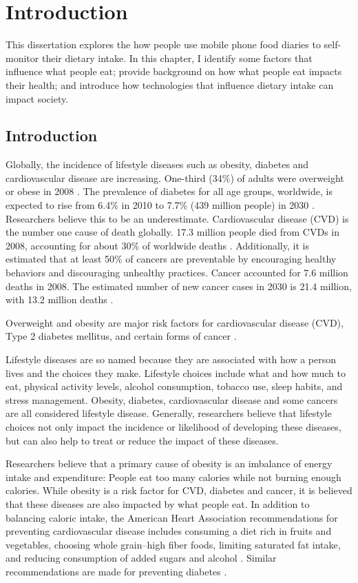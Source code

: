 \chapter {Introduction}

This dissertation explores the how people use mobile phone food diaries to self-monitor their dietary intake. In this chapter, I identify some factors that influence what people eat; provide background on how what people eat impacts their health; and introduce how technologies that influence dietary intake can impact society. 

\section{Introduction}
Globally, the incidence of lifestyle diseases such as obesity, diabetes and cardiovascular disease are increasing. One-third (34\%) of adults were overweight or obese in 2008 \citep{kimokoti_diet_2011}. The prevalence of diabetes for all age groups, worldwide, is expected to rise from 6.4\% in 2010 to 7.7\% (439 million people) in 2030 \citep{Shaw20104}. Researchers believe this to be an underestimate. Cardiovascular disease (CVD) is the number one cause of death globally. 17.3 million people died from CVDs in 2008, accounting for about 30\% of worldwide deaths \citep{WHO_CVD_2011}. Additionally, it is estimated that at least 50\% of cancers are preventable by encouraging healthy behaviors and discouraging unhealthy practices. Cancer accounted for 7.6 million deaths in 2008. The estimated number of new cancer cases in 2030 is 21.4 million, with 13.2 million deaths \citep{american_cancer_society_global_2011}. 

Overweight and obesity are major risk factors for cardiovascular disease (CVD), Type 2 diabetes mellitus, and certain forms of cancer \citep{guh_incidence_2009} \citep{calle_overweight_2004}. 

Lifestyle diseases are so named because they are associated with how a person lives and the choices they make. Lifestyle choices include what and how much to eat, physical activity levels, alcohol consumption, tobacco use, sleep habits, and stress management. Obesity, diabetes, cardiovascular disease and some cancers are all considered lifestyle disease. Generally, researchers believe that lifestyle choices not only impact the incidence or likelihood of developing these diseases, but can also help to treat or reduce the impact of these diseases. 

Researchers believe that a primary cause of obesity is an imbalance of energy intake and expenditure: People eat too many calories while not burning enough calories. While obesity is a risk factor for CVD, diabetes and cancer, it is believed that these diseases are also impacted by what people eat. In addition to balancing caloric intake, the American Heart Association recommendations for preventing cardiovascular disease includes consuming a diet rich in fruits and vegetables, choosing whole grain--high fiber foods, limiting saturated fat intake, and reducing consumption of added sugars and alcohol \citep{Lichtenstein2006}. Similar recommendations are made for preventing diabetes \citep{Hu2001, Thomas2012}. 


